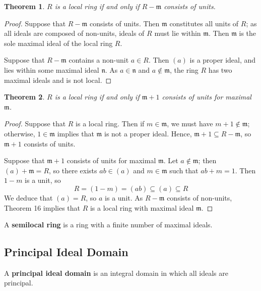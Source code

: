 \documentclass[11pt]{article}
\newtheorem{theorem}{Theorem}
\begin{document}
\begin{adjustwidth}{0.5cm}{}
	\begin{theorem}
		$R$ is a local ring if and only if $R - \mathfrak{m}$ consists of units.
	\end{theorem}
	\begin{proof}
		Suppose that $R - \mathfrak{m}$ consists of units. Then $\mathfrak{m}$ constitutes all units of $R$; as all ideals are composed of non-units, ideals of $R$ must lie within $\mathfrak{m}$. Then $\mathfrak{m}$ is the sole maximal ideal of the local ring $R$.

		Suppose that $R - \mathfrak{m}$ contains a non-unit $a \in R$. Then $(a)$ is a proper ideal, and lies within some maximal ideal $\mathfrak{n}$. As $a \in \mathfrak{n}$ and $a \notin \mathfrak{m}$, the ring $R$ has two maximal ideals and is not local.
	\end{proof}
	\begin{theorem}
		$R$ is a local ring if and only if $\mathfrak{m} + 1$ consists of units for maximal $\mathfrak{m}$.
	\end{theorem}
	\begin{proof}
		Suppose that $R$ is a local ring. Then if $m \in \mathfrak{m}$, we must have $m + 1 \notin \mathfrak{m}$; otherwise, $1 \in \mathfrak{m}$ implies that $\mathfrak{m}$ is not a proper ideal. Hence, $\mathfrak{m} + 1 \subseteq R - \mathfrak{m}$, so $\mathfrak{m} + 1$ consists of units.

		Suppose that $\mathfrak{m} + 1$ consists of units for maximal $\mathfrak{m}$. Let $a \notin \mathfrak{m}$; then $(a) + \mathfrak{m} = R$, so there exists $ab \in (a)$ and $m \in \mathfrak{m}$ such that $ab + m = 1$. Then $1 - m$ is a unit, so
		\[
			R = (1 - m) = (ab) \subseteq (a) \subseteq R
		\]
		We deduce that $(a) = R$, so $a$ is a unit. As $R - \mathfrak{m}$ consists of non-units, Theorem 16 implies that $R$ is a local ring with maximal ideal $\mathfrak{m}$.
	\end{proof}
\end{adjustwidth}

A \textbf{semilocal ring} is a ring with a finite number of maximal ideals.


\subsection{Principal Ideal Domain}

A \textbf{principal ideal domain} is an integral domain in which all ideals are principal.
\end{document}
